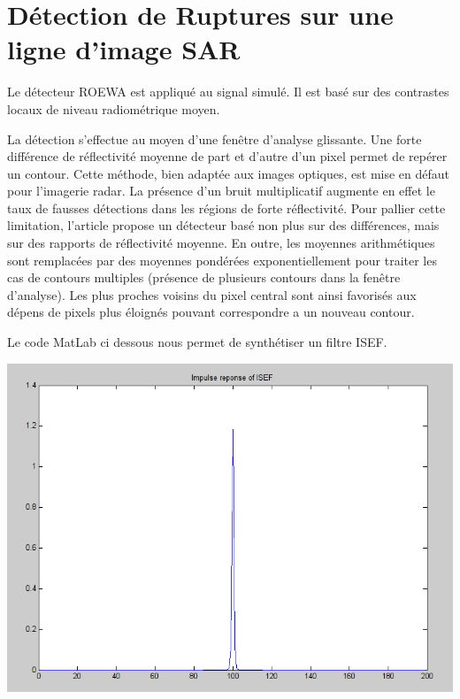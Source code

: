 \documentclass[a4paper,11pt]{article}
\newcommand{\FSource}[1]{%
  
  }
\begin{document}
\vspace{0.5cm}

\newpage

\section{Détection de Ruptures sur une ligne d'image SAR}

Le détecteur ROEWA est appliqué au signal simulé. Il est basé sur des contrastes locaux
de niveau radiométrique moyen.

La détection s'effectue au moyen d'une fenêtre d'analyse glissante. Une forte différence
de réflectivité moyenne de part et d'autre d'un pixel permet de repérer un contour. Cette
méthode, bien adaptée aux images optiques, est mise en défaut pour l'imagerie radar.
La présence d'un bruit multiplicatif augmente en effet le taux de fausses détections
dans les régions de forte réflectivité. Pour pallier cette limitation, l'article propose
un détecteur basé non plus sur des différences, mais sur des rapports de réflectivité
moyenne. En outre, les moyennes arithmétiques sont remplacées par des moyennes
pondérées exponentiellement pour traiter les cas de contours multiples (présence de
plusieurs contours dans la fenêtre d'analyse). Les plus proches voisins du pixel central sont 
ainsi favorisés aux dépens de pixels plus éloignés pouvant correspondre a un
nouveau contour.

Le code MatLab ci dessous nous permet de synthétiser un filtre ISEF.

\vspace{0.5cm}

\FSource{matlab/3-1.m}

\vspace{0.5cm}

\includegraphics[width=15cm]{capture/filtre.png}
\end{document}
